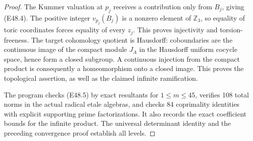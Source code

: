 \begin{proof}
The Kummer valuation at $p_j$ receives a
contribution only from $B_j$, giving (E48.4).
The positive integer $v_{p_j}(B_j)$ is a
nonzero element of $\mathbb Z_3$, so equality
of toric coordinates forces equality of
every $z_j$. This proves injectivity and
torsion-freeness. The target cohomology
quotient is Hausdorff: coboundaries are
the continuous image of the compact module
$J_A$ in the Hausdorff uniform cocycle
space, hence form a closed subgroup.
A continuous injection from the compact
product is consequently a homeomorphism
onto a closed image. This proves the
topological assertion, as well as the
claimed infinite ramification.

The program checks (E48.5) by exact
resultants for $1\le m\le45$, verifies
108 total norms in the actual radical
etale algebras, and checks 84 coprimality
identities with explicit supporting
prime factorizations. It also records
the exact coefficient bounds for the
infinite product. The universal
determinant identity and the preceding
convergence proof establish all levels.
\end{proof}
